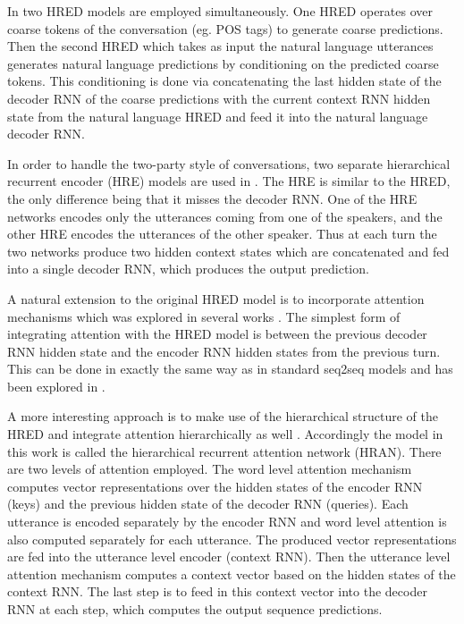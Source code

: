 \documentclass[12pt]{article}
\begin{document}
In \cite{Serban_MrRNN:2017} two HRED models are employed simultaneously. One HRED operates over coarse tokens of the conversation (eg. POS tags) to generate coarse predictions. Then the second HRED which takes as input the natural language utterances generates natural language predictions by conditioning on the predicted coarse tokens. This conditioning is done via concatenating the last hidden state of the decoder RNN of the coarse predictions with the current context RNN hidden state from the natural language HRED and feed it into the natural language decoder RNN.

In order to handle the two-party style of conversations, two separate hierarchical recurrent encoder (HRE) models are used in \cite{Shen:2017}. The HRE is similar to the HRED, the only difference being that it misses the decoder RNN. One of the HRE networks encodes only the utterances coming from one of the speakers, and the other HRE encodes the utterances of the other speaker. Thus at each turn the two networks produce two hidden context states which are concatenated and fed into a single decoder RNN, which produces the output prediction.

A natural extension to the original HRED model is to incorporate attention mechanisms which was explored in several works \cite{Yao:2015,Yao:2016,Xing:2017}. The simplest form of integrating attention with the HRED model is between the previous decoder RNN hidden state and the encoder RNN hidden states from the previous turn. This can be done in exactly the same way as in standard seq2seq models and has been explored in \cite{Yao:2015,Yao:2016}.

A more interesting approach is to make use of the hierarchical structure of the HRED and integrate attention hierarchically as well \cite{Xing:2017}. Accordingly the model in this work is called the hierarchical recurrent attention network (HRAN). There are two levels of attention employed. The word level attention mechanism computes vector representations over the hidden states of the encoder RNN (keys) and the previous hidden state of the decoder RNN (queries). Each utterance is encoded separately by the encoder RNN and word level attention is also computed separately for each utterance. The produced vector representations are fed into the utterance level encoder (context RNN). Then the utterance level attention mechanism computes a context vector based on the hidden states of the context RNN. The last step is to feed in this context vector into the decoder RNN at each step, which computes the output sequence predictions. 
\end{document}
